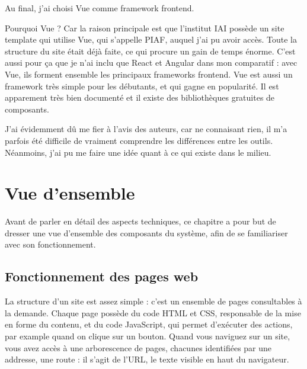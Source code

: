 \documentclass[
    iai, %
    eai, %
]{heig-tb}
\begin{document}

Au final, j'ai choisi Vue comme framework frontend.

Pourquoi Vue ? Car la raison principale est que l'institut IAI possède un site template qui utilise Vue, qui s'appelle PIAF, auquel j'ai pu avoir accès.
Toute la structure du site était déjà faite, ce qui procure un gain de temps énorme.
C'est aussi pour ça que je n'ai inclu que React et Angular dans mon comparatif : avec Vue, ils forment ensemble les principaux frameworks frontend.
Vue est aussi un framework très simple pour les débutants, et qui gagne en popularité.
Il est apparement très bien documenté et il existe des bibliothèques gratuites de composants.

J'ai évidemment dû me fier à l'avis des auteurs, car ne connaisant rien, il m'a parfois été difficile de vraiment comprendre les différences entre les outils.
Néanmoins, j'ai pu me faire une idée quant à ce qui existe dans le milieu.



\chapter{Vue d'ensemble}
Avant de parler en détail des aspects techniques, ce chapitre a pour but de dresser une vue d'ensemble des composants du système, afin de se familiariser avec son fonctionnement.

\section{Fonctionnement des pages web}
La structure d'un site est assez simple : c'est un ensemble de pages consultables à la demande. Chaque page possède du code HTML et CSS, responsable de la mise en forme du contenu, et du code JavaScript, qui permet d'exécuter des actions, par example quand on clique sur un bouton.
Quand vous naviguez sur un site, vous avez accès à une arborescence de pages, chacunes identifiées par une addresse, une route : il s'agit de l'URL, le texte visible en haut du navigateur.
\end{document}
